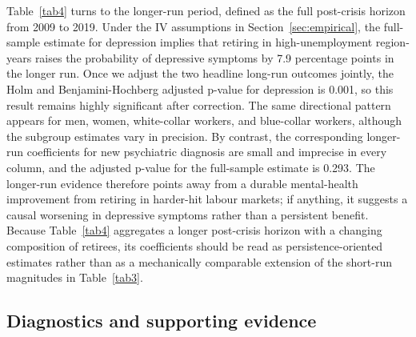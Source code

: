 \documentclass[arguments, manuscript, 11pt]{aastex631}
\begin{document}
Table~\ref{tab4} turns to the longer-run period, defined as the full post-crisis horizon from 2009 to 2019. Under the IV assumptions in Section~\ref{sec:empirical}, the full-sample estimate for depression implies that retiring in high-unemployment region-years raises the probability of depressive symptoms by 7.9 percentage points in the longer run. Once we adjust the two headline long-run outcomes jointly, the Holm and Benjamini-Hochberg adjusted p-value for depression is 0.001, so this result remains highly significant after correction. The same directional pattern appears for men, women, white-collar workers, and blue-collar workers, although the subgroup estimates vary in precision. By contrast, the corresponding longer-run coefficients for new psychiatric diagnosis are small and imprecise in every column, and the adjusted p-value for the full-sample estimate is 0.293. The longer-run evidence therefore points away from a durable mental-health improvement from retiring in harder-hit labour markets; if anything, it suggests a causal worsening in depressive symptoms rather than a persistent benefit. Because Table~\ref{tab4} aggregates a longer post-crisis horizon with a changing composition of retirees, its coefficients should be read as persistence-oriented estimates rather than as a mechanically comparable extension of the short-run magnitudes in Table~\ref{tab3}.


\subsection{Diagnostics and supporting evidence} \label{sec:robustness}
\end{document}
